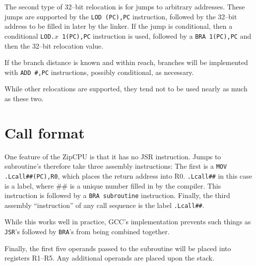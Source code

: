 \documentclass{gqtekspec}
\begin{document}
The second type of 32--bit relocation is for jumps to arbitrary addresses.
These jumps are supported by the \hbox{\tt LOD (PC),PC} instruction, followed
by the 32--bit address to be filled in later by the linker.  If the jump is
conditional, then a conditional \hbox{\tt LOD.$x$ 1(PC),PC} instruction is
used, followed by a {\tt BRA 1(PC),PC} and then the 32--bit relocation value.

If the branch distance is known and within reach, branches will be implemented
with {\tt ADD \#,PC} instructions, possibly conditional, as necessary.

While other relocations are supported, they tend not to be used nearly as much
as these two.

\section{Call format}\label{sec:abi-jsr}

One feature of the ZipCPU is that it has no JSR instruction.  Jumps to
subroutine's therefore take three assembly instructions: 
The first is a {\tt MOV .Lcall\#\#(PC),R0}, which places the return address
into R0.  {\tt .Lcall\#\#} in this case is a label, where \#\# is a unique
number filled in by the compiler.  This instruction is followed by a
{\tt BRA subroutine} instruction.  Finally, the third assembly ``instruction''
of any call sequence is the label {\tt .Lcall\#\#}.

While this works well in practice, GCC's implementation prevents such things
as {\tt JSR}'s followed by {\tt BRA}'s from being combined together.

Finally, the first five operands passed to the subroutine will be placed into
registers R1--R5.  Any additional operands are placed upon the stack.
\end{document}
